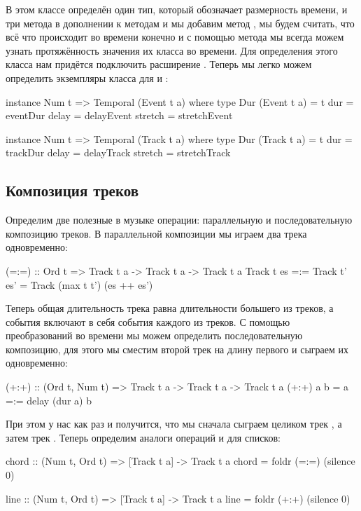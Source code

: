 В этом классе определён один тип, который обозначает размерность
времени, и три метода в дополнении к методам  и 
мы добавим метод , мы будем считать, что всё что происходит во
времени конечно и с помощью метода  мы всегда можем узнать
протяжённость значения их класса  во времени. Для
определения этого класса нам придётся подключить расширение
. Теперь мы легко можем определить экземпляры класса
 для  и :


\begin{code}
instance Num t => Temporal (Event t a) where
    type Dur (Event t a) = t
    dur     = eventDur
    delay   = delayEvent
    stretch = stretchEvent

instance Num t => Temporal (Track t a) where
    type Dur (Track t a) = t
    dur     = trackDur
    delay   = delayTrack
    stretch = stretchTrack    
\end{code}

\subsection{Композиция треков}

Определим две полезные в музыке операции: параллельную и
последовательную композицию треков. В параллельной композиции мы играем
два трека одновременно:


\begin{code}
(=:=) :: Ord t => Track t a -> Track t a -> Track t a
Track t es =:= Track t' es' = Track (max t t') (es ++ es')
\end{code}

Теперь общая длительность трека равна длительности большего из треков, а
события включают в себя события каждого из треков. С помощью
преобразований во времени мы можем определить последовательную
композицию, для этого мы сместим второй трек на длину первого и сыграем
их одновременно:


\begin{code}
(+:+) :: (Ord t, Num t) => Track t a -> Track t a -> Track t a
(+:+) a b = a =:= delay (dur a) b
\end{code}

При этом у нас как раз и получится, что мы сначала сыграем целиком трек
, а затем трек . Теперь определим аналоги операций \In{=:=}
и \In{+:+} для списков:


\begin{code}
chord :: (Num t, Ord t) => [Track t a] -> Track t a
chord = foldr (=:=) (silence 0)

line :: (Num t, Ord t) => [Track t a] -> Track t a
line = foldr (+:+) (silence 0)
\end{code}

